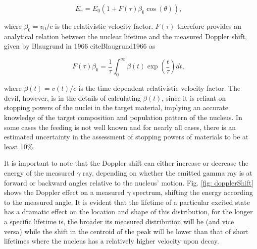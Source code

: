 \begin{equation}
E_{\gamma} = E_{0} \left(1 + F(\tau) \beta_{0} \cos (\theta)   \right),
\label{eqn: dopplerFull}
\end{equation}

\noindent where $\beta_{0} = v_{0}/c$ is the relativistic velocity factor. $F(\tau)$ therefore provides an analytical relation between the nuclear lifetime and the measured Doppler shift, given by Blaugrund in 1966 cite{Blaugrund1966} as

\begin{equation}
F(\tau) \beta_{0} = \dfrac{1}{\tau} \int_{0}^{\infty} \beta(t) \exp \left( \dfrac{t}{\tau} \right) dt,
\end{equation} 

\noindent where $\beta(t) = v(t)/c$ is the time dependent relativistic velocity factor. The devil, however, is in the details of calculating $\beta(t)$, since it is reliant on stopping powers of the nuclei in the target material, implying an accurate knowledge of the target composition and population pattern of the nucleus. In some cases the feeding is not well known and for nearly all cases, there is an estimated uncertainty in the assessment of stopping powers of materials to be at least 10\%.

It is important to note that the Doppler shift can either increase or decrease the energy of the measured $\gamma$ ray, depending on whether the emitted gamma ray is at forward or backward angles relative to the nucleus' motion. Fig. \ref{fig: dopplerShift} shows the Doppler effect on a measured $\gamma$ spectrum, shifting the energy according to the measured angle. It is evident that the lifetime of a particular excited state has a dramatic effect on the location and shape of this distribution, for the longer a specific lifetime is, the broader its measured distribution will be (and vice versa) while the shift in the centroid of the peak will be lower than that of short lifetimes where the nucleus has a relatively higher velocity upon decay. 

